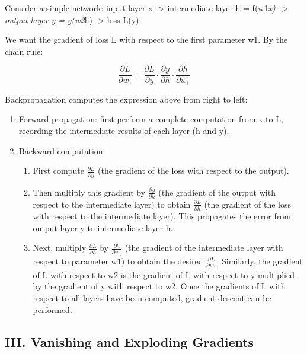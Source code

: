 Consider a simple network: input layer x -\textgreater{} intermediate layer h = f(w1\emph{x) -\textgreater{} output layer y = g(w2}h) -\textgreater{} loss L(y).

We want the gradient of loss L with respect to the first parameter w1. By the chain rule:

\[
\frac{\partial L}{\partial w_1}=\frac{\partial L}{\partial y}\cdot\frac{\partial y}{\partial h}\cdot\frac{\partial h}{\partial w_1}
\]

Backpropagation computes the expression above from right to left:

\begin{enumerate}
\def\labelenumi{\arabic{enumi}.}
\tightlist
\item
  Forward propagation: first perform a complete computation from x to L, recording the intermediate results of each layer (h and y).
\item
{}
  Backward computation:

  \begin{enumerate}
  \def\labelenumii{\alph{enumii}.}
  \tightlist
  \item
    First compute \(\frac{\partial L}{\partial y}\) (the gradient of the loss with respect to the output).
  \item
    Then multiply this gradient by \(\frac{\partial y}{\partial h}\) (the gradient of the output with respect to the intermediate layer) to obtain \(\frac{\partial L}{\partial h}\) (the gradient of the loss with respect to the intermediate layer). This propagates the error from output layer y to intermediate layer h.
  \item
    Next, multiply \(\frac{\partial L}{\partial h}\) by \(\frac{\partial h}{\partial w_1}\) (the gradient of the intermediate layer with respect to parameter w1) to obtain the desired \(\frac{\partial L}{\partial w_1}\).
    Similarly, the gradient of L with respect to w2 is the gradient of L with respect to y multiplied by the gradient of y with respect to w2. Once the gradients of L with respect to all layers have been computed, gradient descent can be performed.
  \end{enumerate}
\end{enumerate}

\hypertarget{iii.-vanishing-and-exploding-gradients}{%
\subsection{III. Vanishing and Exploding Gradients}\label{iii.-vanishing-and-exploding-gradients}}

